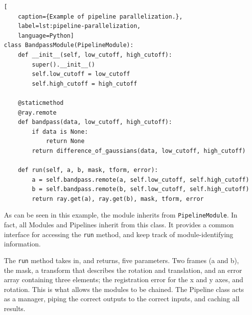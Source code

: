 \begin{lstlisting}[
    caption={Example of pipeline parallelization.},
    label=lst:pipeline-parallelization,
    language=Python]
class BandpassModule(PipelineModule):
    def __init__(self, low_cutoff, high_cutoff):
        super().__init__()
        self.low_cutoff = low_cutoff
        self.high_cutoff = high_cutoff

    @staticmethod
    @ray.remote
    def bandpass(data, low_cutoff, high_cutoff):
        if data is None:
            return None
        return difference_of_gaussians(data, low_cutoff, high_cutoff)

    def run(self, a, b, mask, tform, error):
        a = self.bandpass.remote(a, self.low_cutoff, self.high_cutoff)
        b = self.bandpass.remote(b, self.low_cutoff, self.high_cutoff)
        return ray.get(a), ray.get(b), mask, tform, error
\end{lstlisting}

As can be seen in this example, the module inherits from \texttt{PipelineModule}. In fact, all Modules and Pipelines inherit from this class. It provides a common interface for accessing the \texttt{run} method, and keep track of module-identifying information.

The \lstinline{run} method takes in, and returns, five parameters. Two frames (a and b), the mask, a transform that describes the rotation and translation, and an error array containing three elements; the registration error for the x and y axes, and rotation. This is what allows the modules to be chained. The Pipeline class acts as a manager, piping the correct outputs to the correct inputs, and caching all results.  


